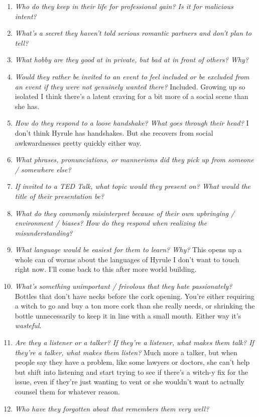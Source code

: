 \begin{enumerate}
    \item \textit{Who do they keep in their life for professional gain? Is it for malicious intent?}

    \item \textit{What’s a secret they haven’t told serious romantic partners and don’t plan to tell?}

    \item \textit{What hobby are they good at in private, but bad at in front of others? Why?}

    \item \textit{Would they rather be invited to an event to feel included or be excluded from an event if they were not genuinely wanted there?}
      Included. Growing up so isolated I think there's a latent craving for a bit more of a social scene than she has.
    \item \textit{How do they respond to a loose handshake? What goes through their head?}
      I don't think Hyrule has handshakes. But she recovers from social awkwardnesses pretty quickly either way.
    \item \textit{What phrases, pronunciations, or mannerisms did they pick up from someone / somewhere else?}
    
    \item \textit{If invited to a TED Talk, what topic would they present on? What would the title of their presentation be?}
    
    \item \textit{What do they commonly misinterpret because of their own upbringing / environment / biases? How do they respond when realizing the misunderstanding?}

    \item \textit{What language would be easiest for them to learn? Why?}
      This opens up a whole can of worms about the languages of Hyrule I don't want to touch right now. I'll come back to this after more world building.
    \item \textit{What’s something unimportant / frivolous that they hate passionately?}
      Bottles that don't have necks before the cork opening. You're either requiring a witch to go and buy a ton more cork than she really needs, or shrinking the bottle unnecessarily to keep it in line with a small mouth. Either way it's \emph{wasteful}.
    \item \textit{Are they a listener or a talker? If they’re a listener, what makes them talk? If they’re a talker, what makes them listen?}
      Much more a talker, but when people say they have a problem, like some lawyers or doctors, she can't help but shift into listening and start trying to see if there's a witch-y fix for the issue, even if they're just wanting to vent or she wouldn't want to actually counsel them for whatever reason. 
    \item \textit{Who have they forgotten about that remembers them very well?}
    

\end{enumerate}
